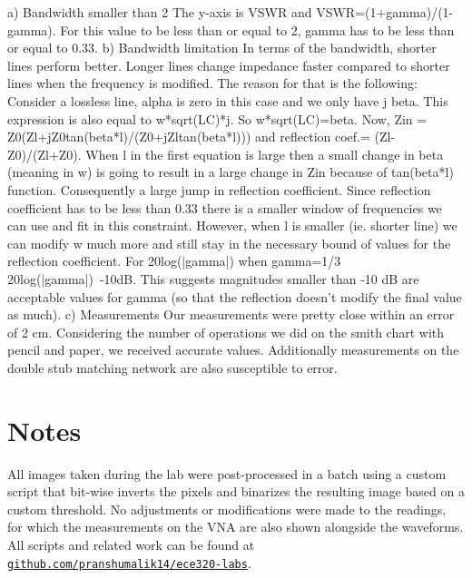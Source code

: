 \documentclass[10pt]{article}
\begin{document}
a)  Bandwidth smaller than 2
    The y-axis is VSWR and VSWR=(1+gamma)/(1-gamma). For this value to be less than or equal to 2, gamma has to be
    less than or equal to 0.33. 
b)  Bandwidth limitation
    In terms of the bandwidth, shorter lines perform better. Longer lines change impedance faster compared
    to shorter lines when the frequency is modified. The reason for that is the following:
    Consider a lossless line, alpha is zero in this case and we only have j beta. This expression is also 
    equal to w*sqrt(LC)*j. So w*sqrt(LC)=beta. Now, Zin = Z0(Zl+jZ0tan(beta*l)/(Z0+jZltan(beta*l))) and
    reflection coef.= (Zl-Z0)/(Zl+Z0). When l in the first equation is large then a small change in beta (meaning in w)
    is going to result in a large change in Zin because of tan(beta*l) function. Consequently a large jump in reflection coefficient. 
    Since reflection coefficient has to be less than 0.33 there is a smaller window of frequencies we can use
    and fit in this constraint. However, when l is smaller (ie. shorter line) we can modify w much more and
    still stay in the necessary bound of values for the reflection coefficient. 
    For 20log(|gamma|) when gamma=1/3 20log(|gamma|)~-10dB. This suggests magnitudes smaller than -10 dB are 
    acceptable values for gamma (so that the reflection doesn't modify the final value as much).
c)  Measurements
    Our measurements were pretty close within an error of 2 cm. Considering the number of operations we did
    on the smith chart with pencil and paper, we received accurate values. Additionally measurements on 
    the double stub matching network are also susceptible to error.

\section{Notes}

All images taken during the lab were post-processed in a batch using a custom script
that bit-wise inverts the pixels and binarizes the resulting image based on a custom threshold.
No adjustments or modifications were made to the readings, for which the measurements on the VNA
are also shown alongside the waveforms. All scripts and related work can be found at 
\href{https://github.com/pranshumalik14/ece320-labs}{\texttt{github.com/pranshumalik14/ece320-labs}}.
\end{document}
